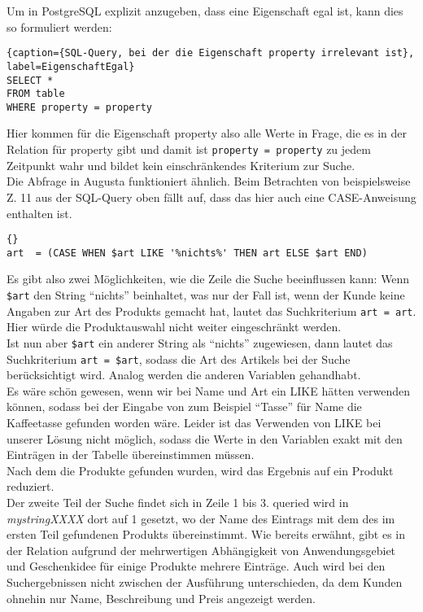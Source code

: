 Um in PostgreSQL explizit anzugeben, dass eine Eigenschaft egal ist, kann dies so formuliert werden:
\begin{lstlisting}{caption={SQL-Query, bei der die Eigenschaft property irrelevant ist}, label=EigenschaftEgal}
SELECT *
FROM table
WHERE property = property
\end{lstlisting}
Hier kommen für die Eigenschaft property also alle Werte in Frage, die es in der Relation für property gibt und damit ist \lstinline{property = property} zu jedem Zeitpunkt wahr und bildet kein einschränkendes Kriterium zur Suche.\\
Die Abfrage in Augusta funktioniert ähnlich. Beim Betrachten von beispielsweise Z. 11 aus der SQL-Query oben fällt auf, dass das hier auch eine CASE-Anweisung enthalten ist.
\begin{lstlisting}{}
art  = (CASE WHEN $art LIKE '%nichts%' THEN art ELSE $art END)
\end{lstlisting}
Es gibt also zwei Möglichkeiten, wie die Zeile die Suche beeinflussen kann: Wenn \lstinline|$art| den String "`nichts"' beinhaltet, was nur der Fall ist, wenn der Kunde keine Angaben zur Art des Produkts gemacht hat, lautet das Suchkriterium \lstinline|art = art|. Hier würde die Produktauswahl nicht weiter eingeschränkt werden.\\
Ist nun aber \lstinline|$art| ein anderer String als "`nichts"' zugewiesen, dann lautet das Suchkriterium \lstinline|art = $art|, sodass die Art des Artikels bei der Suche berücksichtigt wird. Analog werden die anderen Variablen gehandhabt.\\
Es wäre schön gewesen, wenn wir bei Name und Art ein LIKE hätten verwenden können, sodass bei der Eingabe von zum Beispiel "`Tasse"' für Name die Kaffeetasse gefunden worden wäre. Leider ist das Verwenden von LIKE bei unserer Lösung nicht möglich, sodass die Werte in den Variablen exakt mit den Einträgen in der Tabelle übereinstimmen müssen.\\
Nach dem die Produkte gefunden wurden, wird das Ergebnis auf ein Produkt reduziert.\\
Der zweite Teil der Suche findet sich in Zeile 1 bis 3. queried wird in \textit{mystringXXXX} dort auf 1 gesetzt, wo der Name des Eintrags mit dem des im ersten Teil gefundenen Produkts übereinstimmt. Wie bereits erwähnt, gibt es in der Relation aufgrund der mehrwertigen Abhängigkeit von Anwendungsgebiet und Geschenkidee für einige Produkte mehrere Einträge. Auch wird bei den Suchergebnissen nicht zwischen der Ausführung unterschieden, da dem Kunden ohnehin nur Name, Beschreibung und Preis angezeigt werden.\\



